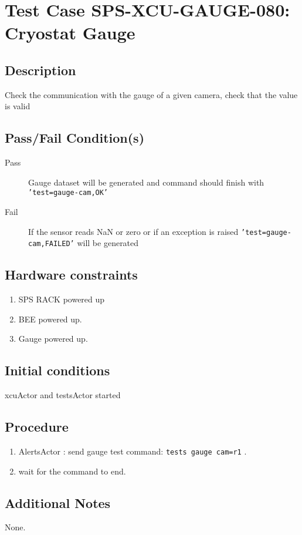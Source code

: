 \section{Test Case SPS-XCU-GAUGE-080: Cryostat Gauge}

\subsection{Description}

Check the communication with the gauge of a given camera, check that the value is valid

\subsection{Pass/Fail Condition(s)}

\begin{description}
\item [Pass] Gauge dataset will be generated and command should finish with \texttt{'test=gauge-cam,OK'}
\item [Fail] If the sensor reads NaN or zero or if an exception is raised \texttt{'test=gauge-cam,FAILED'} will be generated

\end{description}

\subsection{Hardware constraints}

\begin{enumerate}
    \item SPS RACK powered up
    \item BEE powered up.
    \item Gauge powered up.
\end{enumerate}

\subsection{Initial conditions}

xcuActor and testsActor started

\subsection{Procedure}

\begin{enumerate}
    \item AlertsActor : send gauge test command: \texttt{tests gauge cam=r1} .
    \item wait for the command to end.
\end{enumerate}

\subsection{Additional Notes}
None.
